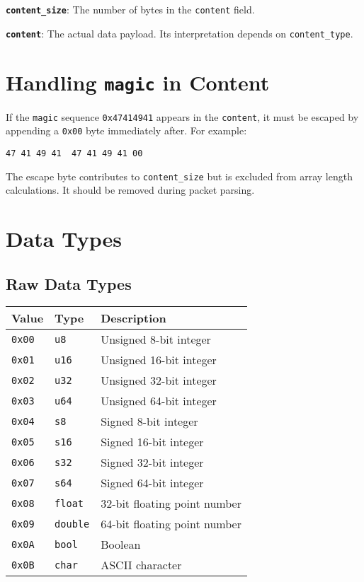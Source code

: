 \documentclass[a4paper]{article}
\begin{document}
\textbf{\texttt{content\_size}}: The number of bytes in the \texttt{content} field.

\textbf{\texttt{content}}: The actual data payload. Its interpretation depends on \texttt{content\_type}.

\section*{Handling \texttt{magic} in Content}
If the \texttt{magic} sequence \texttt{0x47414941} appears in the \texttt{content}, it must be escaped by appending a \texttt{0x00} byte immediately after. For example:

\texttt{47 41 49 41 }\textrightarrow\texttt{ 47 41 49 41 00}

The escape byte contributes to \texttt{content\_size} but is excluded from array length calculations. It should be removed during packet parsing.

\section*{Data Types}\label{data-types}
\subsection*{Raw Data Types}
\begin{longtable}{@{}lll@{}}
\toprule
Value    & Type             & Description                  \\
\midrule
\texttt{0x00} & \texttt{u8}       & Unsigned 8-bit integer       \\
\texttt{0x01} & \texttt{u16}      & Unsigned 16-bit integer      \\
\texttt{0x02} & \texttt{u32}      & Unsigned 32-bit integer      \\
\texttt{0x03} & \texttt{u64}      & Unsigned 64-bit integer      \\
\texttt{0x04} & \texttt{s8}       & Signed 8-bit integer         \\
\texttt{0x05} & \texttt{s16}      & Signed 16-bit integer        \\
\texttt{0x06} & \texttt{s32}      & Signed 32-bit integer        \\
\texttt{0x07} & \texttt{s64}      & Signed 64-bit integer        \\
\texttt{0x08} & \texttt{float}    & 32-bit floating point number \\
\texttt{0x09} & \texttt{double}   & 64-bit floating point number \\
\texttt{0x0A} & \texttt{bool}     & Boolean                      \\
\texttt{0x0B} & \texttt{char}     & ASCII character              \\
\bottomrule
\end{longtable}
\end{document}
